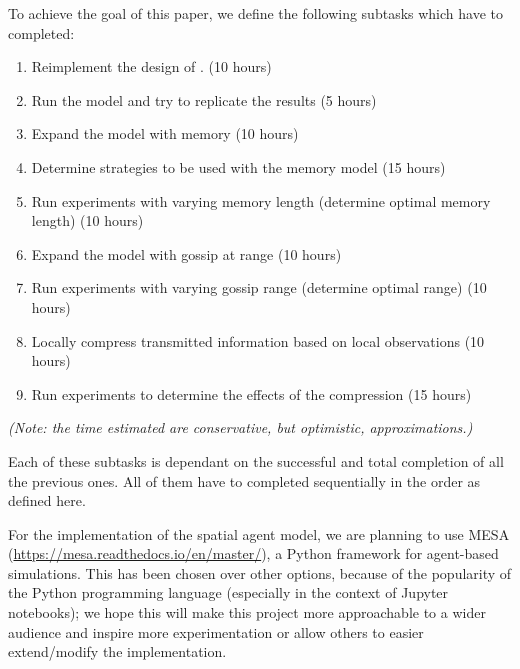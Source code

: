 \documentclass[english]{article}
\begin{document}
To achieve the goal of this paper, we define the following subtasks which have to completed:
\newcommand{\timeest}[1]{\hfill(#1 hours)}
\begin{enumerate}
  \item \label{subtasks:smaldino}
    Reimplement the design of \citet{smaldino}.
    \timeest{10}
  \item \label{subtasks:smaldino-experiments}
    Run the model and try to replicate the results
    \timeest{5}
  \item \label{subtasks:memory}
    Expand the model with memory
    \timeest{10}
  \item \label{subtasks:memory-strategies}
    Determine strategies to be used with the memory model
    \timeest{15}
  \item \label{subtasks:memory-experiments}
    Run experiments with varying memory length (determine optimal memory length)
    \timeest{10}
  \item \label{subtasks:gossip}
    Expand the model with gossip at range
    \timeest{10}
  \item \label{subtasks:gossip-experiments}
    Run experiments with varying gossip range (determine optimal range)
    \timeest{10}
  \item \label{subtasks:compress}
    Locally compress transmitted information based on local observations
    \timeest{10}
  \item \label{subtasks:compress-experiments}
    Run experiments to determine the effects of the compression
    \timeest{15}
\end{enumerate}
\textit{(Note: the time estimated are conservative, but optimistic, approximations.)}

Each of these subtasks is dependant on the successful and total completion of all the previous ones. All of them have to completed sequentially in the order as defined here.

For the implementation of the spatial agent model, we are planning to use MESA (\url{https://mesa.readthedocs.io/en/master/}), a Python framework for agent-based simulations. This has been chosen over other options, because of the popularity of the Python programming language (especially in the context of Jupyter notebooks); we hope this will make this project more approachable to a wider audience and inspire more experimentation or allow others to easier extend/modify the implementation.
\end{document}
